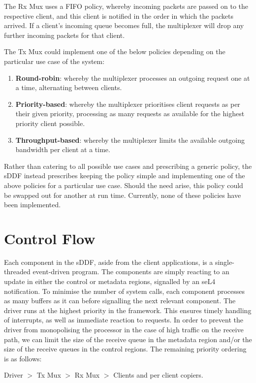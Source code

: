 The Rx Mux uses a FIFO policy, whereby incoming packets are passed on to the respective client, and this client is notified in the 
order in which the packets arrived. If a client's incoming queue becomes full, the multiplexer will drop any further
incoming packets for that client.

The Tx Mux could implement one of the below policies depending on the particular use case of the system:
\begin{enumerate}
\item \textbf{Round-robin}: whereby the multiplexer processes an outgoing request one at a time, alternating between clients.
\item \textbf{Priority-based}: whereby the multiplexer prioritises client requests as per their given priority, processing as many
requests as available for the highest priority client possible. 
\item \textbf{Throughput-based}: whereby the multiplexer limits the available outgoing bandwidth per client at a time.
\end{enumerate}
Rather than catering to all possible use cases and prescribing a generic policy, the sDDF instead prescribes 
keeping the policy simple and implementing one of the above policies for 
a particular use case. Should the need arise, this policy could be swapped out for another at run time. Currently,
none of these policies have been implemented.

\section{Control Flow}
Each component in the sDDF, aside from the client applications, is a single-threaded event-driven program. The
components are simply reacting to an update in either the control or metadata regions, signalled by an seL4 notification. 
To minimise the number of system calls, each component processes as many buffers as it can before signalling the next
relevant component.
The driver runs at the highest priority in the framework. This ensures timely handling of interrupts, as well
as immediate reaction to requests. In order to prevent the driver from monopolising the processor in the case
of high traffic on the receive path, we can limit the size of the receive queue in the metadata region and/or 
the size of the receive queues in the control regions.
The remaining priority ordering is as follows:

\centerline{Driver \(>\) Tx Mux \(>\) Rx Mux \(>\) Clients and per client copiers.}

